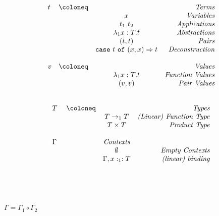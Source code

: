 \begin{minipage}{\textwidth}
  \begin{minipage}{0.45\textwidth}
    \[
      \begin{array}{lccr}
        t & \coloneq & & \emph{Terms}\\
        & & x & \emph{Variables}\\
        && t_1\ t_2 & \emph{Applications}\\
        && \lambda_1 x:T.t & \emph{Abstractions}\\
        && (t, t) & \emph{Pairs}\\
        && \mathtt{case}\ t \ \mathtt{of}\ (x,x) \Rightarrow t & \emph{Deconstruction}\\
        \\
        v & \coloneq & & \emph{Values}\\
        & & \lambda_1 x:T.t & \emph{Function Values}\\
        && (v,v) & \emph{Pair Values}\\
        \\
      \end{array}
    \]
  \end{minipage}
  \hfill
  \begin{minipage}{0.45\textwidth}
    \[
      \begin{array}{lccr}
        T & \coloneq && \emph{Types}\\
        && T\rightarrow_1 T & \emph{(Linear) Function Type}\\
        && T \times T & \emph{Product Type}\\
        \\
        \Gamma & & \emph{Contexts}\\
        & & \emptyset & \emph{Empty Contexts}\\
        & & \Gamma, x :_1 : T &\emph{(linear) binding}\\
        \phantom{\quad}\\
        \phantom{\quad}\\
        \phantom{\quad}\\
        \phantom{\quad}
      \end{array}
    \]
  \end{minipage}
  \hfill
  \vspace{0.5em}
\end{minipage}
\quad
$\Gamma = \Gamma_1\circ\Gamma_2$\\
\vspace{1em}
